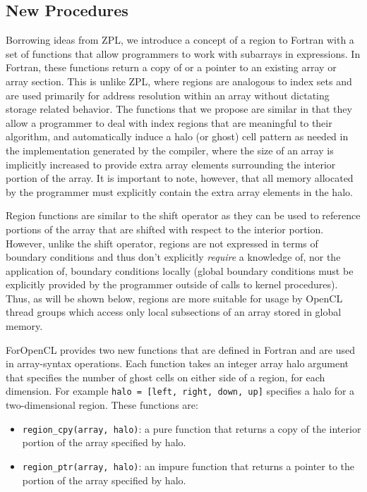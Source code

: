 \subsection{New Procedures}

Borrowing ideas from ZPL, we introduce a concept of a region to Fortran with a
set of functions that allow programmers to work with subarrays in expressions.
In Fortran, these functions return a copy of or a pointer to an existing array or array section.
This is unlike ZPL, where regions are analogous to index sets and are used
primarily for address resolution within an array without dictating storage
related behavior.  The functions that we propose are similar in that they allow
a programmer to deal with index regions that are meaningful to their algorithm,
and automatically induce a halo (or ghost) cell pattern as needed in the
implementation generated by the compiler, where the size of an array is
implicitly increased to provide extra array elements surrounding the interior 
portion of the array.  It is important to note, however, that all memory allocated
by the programmer must explicitly contain the extra array elements in the halo.

Region functions are similar to the shift operator as they can be used to
reference portions of the array that are shifted with respect to the interior
portion.  However, unlike the shift operator, regions are not expressed in terms
of boundary conditions and thus don't explicitly \emph{require} a knowledge of,
nor the application of, boundary conditions locally (global boundary conditions must
be explicitly provided by the programmer outside of calls to kernel procedures).
Thus, as will be shown
below, regions are more suitable for usage by OpenCL thread groups which access
only local subsections of an array stored in global memory.

ForOpenCL provides two new functions that are defined in Fortran and are used
in array-syntax operations.  Each function takes an integer array halo argument
that specifies the number of ghost cells on either side of a region, for each
dimension.  For example {\tt halo = [left, right, down, up]} specifies a halo
for a two-dimensional region.  These functions are:

\begin{itemize}

\item {\tt region\_cpy(array, halo)}: a pure function that returns a copy of
  the interior portion of the array specified by halo.

\item {\tt region\_ptr(array, halo)}: an impure function that returns a pointer 
  to the portion of the array specified by halo.

\end{itemize}


